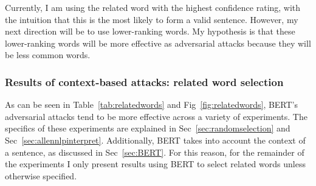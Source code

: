 Currently, I am using the related word with the highest confidence rating, with the intuition that this is the most likely to form a valid sentence. However, my next direction will be to use lower-ranking words. My hypothesis is that these lower-ranking words will be more effective as adversarial attacks because they will be less common words.

\subsubsection{Results of context-based attacks: related word selection}
As can be seen in Table~\ref{tab:relatedwords} and Fig~\ref{fig:relatedwords}, BERT's adversarial attacks tend to be more effective across a variety of experiments. The specifics of these experiments are explained in Sec~\ref{sec:randomselection} and Sec~\ref{sec:allennlpinterpret}. Additionally, BERT takes into account the context of a sentence, as discussed in Sec~\ref{sec:BERT}. For this reason, for the remainder of the experiments I only present results using BERT to select related words unless otherwise specified.

